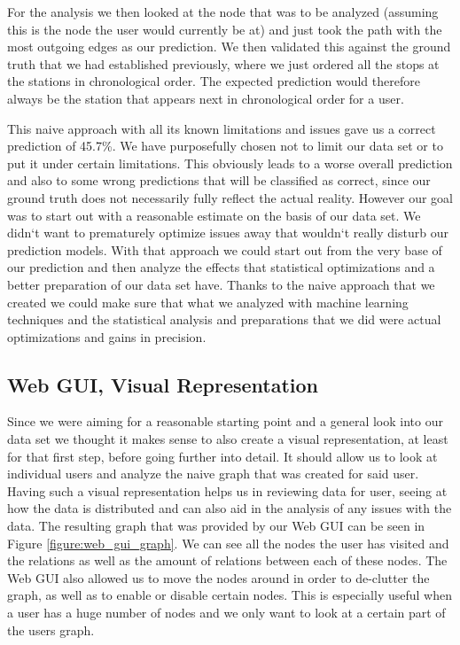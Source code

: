 For the analysis we then looked at the node that was to be analyzed (assuming this is the node the user would currently be at) and just took the path with the most outgoing edges as our prediction. We then validated this against the ground truth that we had established previously, where we just ordered all the stops at the stations in chronological order. The expected prediction would therefore always be the station that appears next in chronological order for a user. 

This naive approach with all its known limitations and issues gave us a correct prediction of 45.7\%. We have purposefully chosen not to limit our data set or to put it under certain limitations. This obviously leads to a worse overall prediction and also to some wrong predictions that will be classified as correct, since our ground truth does not necessarily fully reflect the actual reality. However our goal was to start out with a reasonable estimate on the basis of our data set. We didn`t want to prematurely optimize issues away that wouldn`t really disturb our prediction models. With that approach we could start out from the very base of our prediction and then analyze the effects that statistical optimizations and a better preparation of our data set have. Thanks to the naive approach that we created we could make sure that what we analyzed with machine learning techniques and the statistical analysis and preparations that we did were actual optimizations and gains in precision.

\subsection{Web GUI, Visual Representation}
\label{subsec:web_gui}
Since we were aiming for a reasonable starting point and a general look into our data set we thought it makes sense to also create a visual representation, at least for that first step, before going further into detail. It should allow us to look at individual users and analyze the naive graph that was created for said user. Having such a visual representation helps us in reviewing data for user, seeing at how the data is distributed and can also aid in the analysis of any issues with the data. The resulting graph that was provided by our Web GUI can be seen in Figure \ref{figure:web_gui_graph}. We can see all the nodes the user has visited and the relations as well as the amount of relations between each of these nodes. The Web GUI also allowed us to move the nodes around in order to de-clutter the graph, as well as to enable or disable certain nodes. This is especially useful when a user has a huge number of nodes and we only want to look at a certain part of the users graph.

